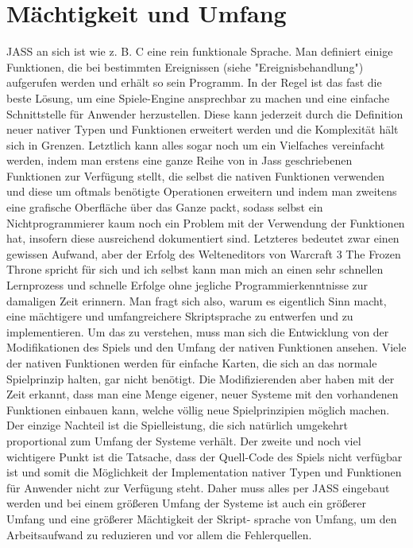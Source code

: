 \section { Mächtigkeit und Umfang }
JASS an sich ist wie z. B. C eine rein funktionale Sprache. Man definiert einige Funktionen, die bei bestimmten Ereignissen (siehe "Ereignisbehandlung")
aufgerufen werden und erhält so sein Programm. In der Regel ist das fast die beste Lösung, um eine Spiele-Engine ansprechbar zu machen und eine einfache
Schnittstelle für Anwender herzustellen. Diese kann jederzeit durch die Definition neuer nativer Typen und Funktionen erweitert werden und die Komplexität
hält sich in Grenzen. Letztlich kann alles sogar noch um ein Vielfaches vereinfacht werden, indem man erstens eine ganze Reihe von in Jass geschriebenen
Funktionen zur Verfügung stellt, die selbst die nativen Funktionen verwenden und diese um oftmals benötigte Operationen erweitern und indem man zweitens
eine grafische Oberfläche über das Ganze packt, sodass selbst ein Nichtprogrammierer kaum noch ein Problem mit der Verwendung der Funktionen hat, insofern
diese ausreichend dokumentiert sind.
Letzteres bedeutet zwar einen gewissen Aufwand, aber der Erfolg des Welteneditors von Warcraft 3 The Frozen Throne spricht für sich und ich selbst kann
man mich an einen sehr schnellen Lernprozess und schnelle Erfolge ohne jegliche Programmierkenntnisse zur damaligen Zeit erinnern.
Man fragt sich also, warum es eigentlich Sinn macht, eine mächtigere und umfangreichere Skriptsprache zu entwerfen und zu implementieren.
Um das zu verstehen, muss man sich die Entwicklung von der Modifikationen des Spiels und den Umfang der nativen Funktionen ansehen.
Viele der nativen Funktionen werden für einfache Karten, die sich an das normale Spielprinzip halten, gar nicht benötigt. Die Modifizierenden aber haben
mit der Zeit erkannt, dass man eine Menge eigener, neuer Systeme mit den vorhandenen Funktionen einbauen kann, welche völlig neue Spielprinzipien möglich machen.
Der einzige Nachteil ist die Spielleistung, die sich natürlich umgekehrt proportional zum Umfang der Systeme verhält.
Der zweite und noch viel wichtigere Punkt ist die Tatsache, dass der Quell-Code des Spiels nicht verfügbar ist und somit die Möglichkeit der Implementation
nativer Typen und Funktionen für Anwender nicht zur Verfügung steht.
Daher muss alles per JASS eingebaut werden und bei einem größeren Umfang der Systeme ist auch ein größerer Umfang und eine größerer Mächtigkeit der Skript-
sprache von Umfang, um den Arbeitsaufwand zu reduzieren und vor allem die Fehlerquellen.

